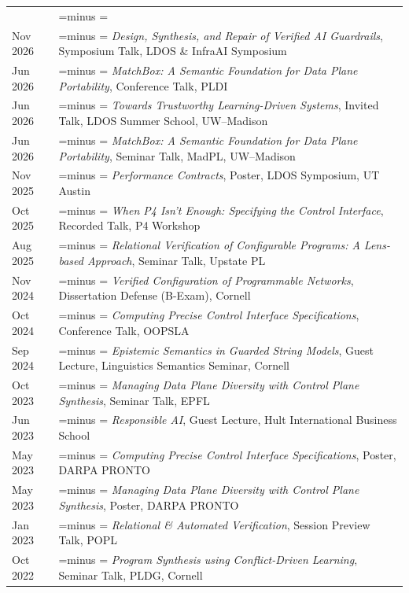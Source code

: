 \documentclass[letterpaper,10pt,oneside]{article}
\makeatletter
\newlength{\leftcol}  \setlength{\leftcol}{1.05in}
\newlength{\colsep}   \setlength{\colsep}{1em}
\newlength{\rightcol}
\newcommand{\balancedrag}{%
  \setlength{\rightskip}{0pt plus 0.45\rightcol}%
  \setlength{\parfillskip}{0pt}%
  \spaceskip=\fontdimen2\font minus \fontdimen4\font
  \xspaceskip=\spaceskip
  \hbadness=10000 \hyphenpenalty=10000 \exhyphenpenalty=10000 \emergencystretch=0pt}
\newenvironment{cvsection}[1]
  {\par\vspace{0.9em}%
   \setlength{\rightcol}{\dimexpr\linewidth-\leftcol-\colsep\relax}%
   \noindent\begin{longtable}[l]{@{}>{\raggedleft\arraybackslash}p{\leftcol}@{\hspace{\colsep}}>{\raggedright\balancedrag\arraybackslash}p{\rightcol}@{}}
   \multicolumn{2}{@{}l}{\Large #1} \\*\noalign{\nobreak\vspace{0.4em}}}
  {\end{longtable}}
\makeatother
\begin{document}
\begin{cvsection}{Talks \& Posters}
  Nov 2026 & \textit{Design, Synthesis, and Repair of Verified AI Guardrails}, Symposium Talk, LDOS \& InfraAI Symposium \\[0.3em]
  Jun 2026 & \textit{MatchBox: A Semantic Foundation for Data Plane Portability}, Conference Talk, PLDI \\[0.3em]
  Jun 2026 & \textit{Towards Trustworthy Learning-Driven Systems}, Invited Talk, LDOS Summer School, UW--Madison \\[0.3em]
  Jun 2026 & \textit{MatchBox: A Semantic Foundation for Data Plane Portability}, Seminar Talk, MadPL, UW--Madison \\[0.3em]
  Nov 2025 & \textit{Performance Contracts}, Poster, LDOS Symposium, UT Austin \\[0.3em]
  Oct 2025 & \textit{When P4 Isn't Enough: Specifying the Control Interface}, Recorded Talk, P4 Workshop \\[0.3em]
  Aug 2025 & \textit{Relational Verification of Configurable Programs: A Lens-based Approach}, Seminar Talk, Upstate PL \\[0.3em]
  Nov 2024 & \textit{Verified Configuration of Programmable Networks}, Dissertation Defense (B-Exam), Cornell \\[0.3em]
  Oct 2024 & \textit{Computing Precise Control Interface Specifications}, Conference Talk, OOPSLA \\[0.3em]
  Sep 2024 & \textit{Epistemic Semantics in Guarded String Models}, Guest Lecture, Linguistics Semantics Seminar, Cornell \\[0.3em]
  Oct 2023 & \textit{Managing Data Plane Diversity with Control Plane Synthesis}, Seminar Talk, EPFL \\[0.3em]
  Jun 2023 & \textit{Responsible AI}, Guest Lecture, Hult International Business School \\[0.3em]
  May 2023 & \textit{Computing Precise Control Interface Specifications}, Poster, DARPA PRONTO \\[0.3em]
  May 2023 & \textit{Managing Data Plane Diversity with Control Plane Synthesis}, Poster, DARPA PRONTO \\[0.3em]
  Jan 2023 & \textit{Relational \& Automated Verification}, Session Preview Talk, POPL \\[0.3em]
  Oct 2022 & \textit{Program Synthesis using Conflict-Driven Learning}, Seminar Talk, PLDG, Cornell \\[0.3em]

\end{cvsection}
\end{document}
